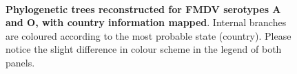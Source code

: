 \documentclass[10pt]{article}
\begin{document}
\newpage

\begin{figure}[!ht]
\begin{center}
\\
\end{center}
\caption{\textbf{Phylogenetic trees reconstructed for FMDV serotypes A and O, with country information mapped}. 
Internal branches are coloured according to the most probable state (country).
Please notice the slight difference in colour scheme in the legend of both panels.
}
\label{fig:trees}
\end{figure}
\end{document}
